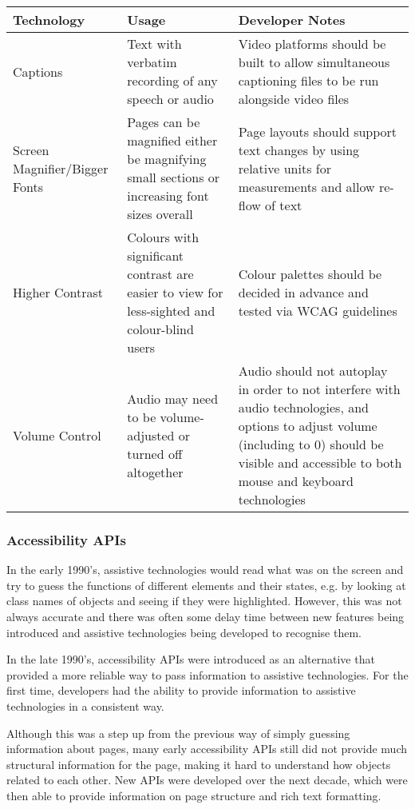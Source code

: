 \documentclass[ %
                    author={Aleena Baig},
                supervisor={Dr Simon Lock},
                    degree={BSc},
                     title={On Making Web Accessible Graphs},
                  subtitle={},
                      year={2019} ]{dissertation}
\begin{document}
\begin{center}
\begin{tabular}{|p{3cm}|p{5cm}|p{5cm}|}
 \hline
 Technology & Usage & Developer Notes \\ [0.5ex]
 \hline \hline
 Captions & Text with verbatim recording of any speech or audio & Video platforms should be built to allow simultaneous captioning files to be run alongside video files \\
 \hline
 Screen Magnifier/Bigger Fonts & Pages can be magnified either be magnifying small sections or increasing font sizes overall & Page layouts should support text changes by using relative units for measurements and allow re-flow of text \\
 \hline
 Higher Contrast & Colours with significant contrast are easier to view for less-sighted and colour-blind users & Colour palettes should be decided in advance and tested via WCAG guidelines \\
 \hline
 Volume Control & Audio may need to be volume-adjusted or turned off altogether & Audio should not autoplay in order to not interfere with audio technologies, and options to adjust volume (including to 0) should be visible and accessible to both mouse and keyboard technologies \\ [1ex]
 \hline
\end{tabular}
\end{center}


\subsubsection{Accessibility APIs}

In the early 1990's, assistive technologies would read what was on the screen and try to guess the functions of different elements and their states, e.g. by looking at class names of objects and seeing if they were highlighted. However, this was not always accurate and there was often some delay time between new features being introduced and assistive technologies being developed to recognise them. \cite{smashingAPIs}

In the late 1990's, accessibility APIs were introduced as an alternative that provided a more reliable way to pass information to assistive technologies. For the first time, developers had the ability to provide information to assistive technologies in a consistent way.

Although this was a step up from the previous way of simply guessing information about pages, many early accessibility APIs still did not provide much structural information for the page, making it hard to understand how objects related to each other. New APIs were developed over the next decade, which were then able to provide information on page structure and rich text formatting.
\end{document}
